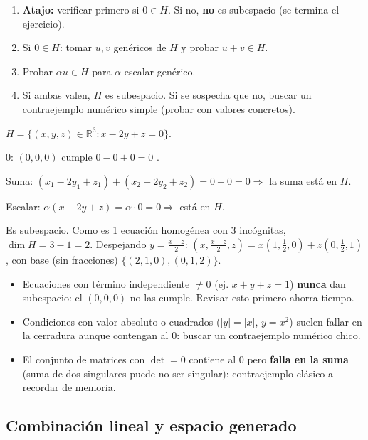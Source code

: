 \documentclass[11pt,a4paper]{article}
\begin{document}
\begin{proc}
\begin{enumerate}
    \item \textbf{Atajo:} verificar primero si $0\in H$. Si no, \textbf{no} es subespacio
    (se termina el ejercicio).
    \item Si $0\in H$: tomar $u,v$ genéricos de $H$ y probar $u+v\in H$.
    \item Probar $\alpha u\in H$ para $\alpha$ escalar genérico.
    \item Si ambas valen, $H$ es subespacio. Si se sospecha que no, buscar un
    contraejemplo numérico simple (probar con valores concretos).
\end{enumerate}
\end{proc}

\begin{ejemplo}
$H=\{(x,y,z)\in\mathbb R^3: x-2y+z=0\}$.

$0$: $(0,0,0)$ cumple $0-0+0=0$ \checkmark.

Suma: $(x_1-2y_1+z_1)+(x_2-2y_2+z_2)=0+0=0\Rightarrow$ la suma está en $H$.

Escalar: $\alpha(x-2y+z)=\alpha\cdot0=0\Rightarrow$ está en $H$.

Es subespacio. Como es 1 ecuación homogénea con 3 incógnitas, $\dim H=3-1=2$. Despejando
$y=\frac{x+z}{2}$: $(x,\frac{x+z}2,z)=x(1,\tfrac12,0)+z(0,\tfrac12,1)$, con base (sin
fracciones) $\{(2,1,0),(0,1,2)\}$.
\end{ejemplo}

\begin{atencion}
\begin{itemize}
    \item Ecuaciones con término independiente $\neq0$ (ej. $x+y+z=1$) \textbf{nunca} dan
    subespacio: el $(0,0,0)$ no las cumple. Revisar esto primero ahorra tiempo.
    \item Condiciones con valor absoluto o cuadrados ($|y|=|x|$, $y=x^2$) suelen fallar en
    la cerradura aunque contengan al $0$: buscar un contraejemplo numérico chico.
    \item El conjunto de matrices con $\det=0$ contiene al $0$ pero \textbf{falla en la
    suma} (suma de dos singulares puede no ser singular): contraejemplo clásico a
    recordar de memoria.
\end{itemize}
\end{atencion}

\subsection{Combinación lineal y espacio generado}
\end{document}

